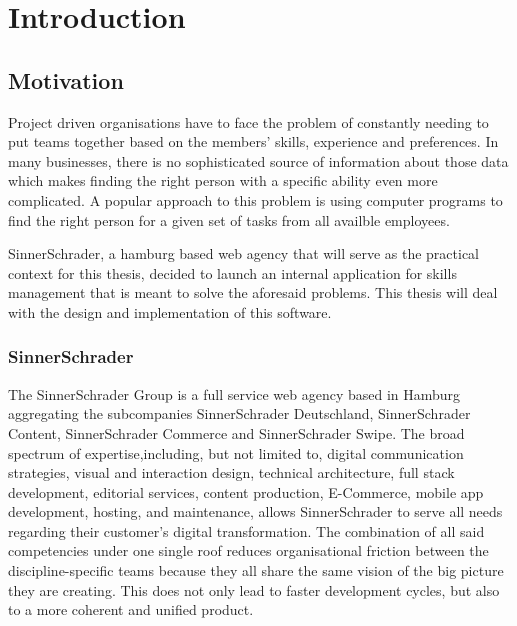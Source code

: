 \chapter{Introduction}

\section{Motivation}
Project driven organisations have to face the problem of constantly needing to put teams together based on the members’ skills, experience and preferences.
In many businesses, there is no sophisticated source of information about those data which makes finding the right person with a specific ability even more complicated. A popular approach to this problem is using computer programs to find the right person for a given set of tasks from all availble employees.

SinnerSchrader, a hamburg based web agency that will serve as the practical context for this thesis, decided to launch an internal application for skills management that is meant to solve the aforesaid problems. This thesis will deal with the design and implementation of this software.



\subsection{SinnerSchrader}

The SinnerSchrader Group is a full service web agency based in Hamburg aggregating the subcompanies SinnerSchrader Deutschland, SinnerSchrader Content, SinnerSchrader Commerce and SinnerSchrader Swipe. The broad spectrum of expertise,including, but not limited to, digital communication strategies, visual and interaction design,  technical architecture, full stack development, editorial services, content production, E-Commerce, mobile app development, hosting, and maintenance, allows SinnerSchrader to serve all needs regarding their customer’s digital transformation. The combination of all said competencies under one single roof reduces organisational friction between the discipline-specific teams because they all share the same vision of the big picture they are creating. This does not only lead to faster development cycles, but also to a more coherent and unified product.

